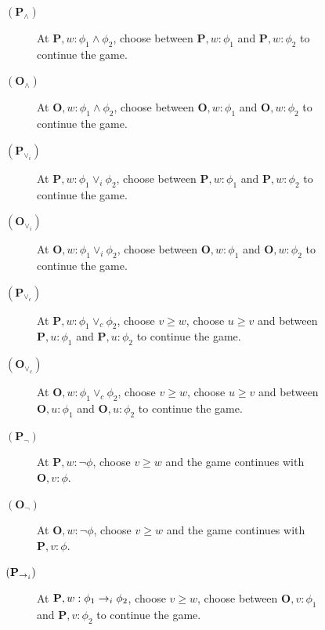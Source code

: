 \begin{figure}
\begin{minipage}[t]{\textwidth}
    \hrulefill
\begin{description}
\item[$(\mathbf{P}_\wedge)$] At $\mathbf{P}, w: \phi_1\wedge \phi_2$, \You
    choose between $\mathbf{P},w:\phi_1$ and 
    $\mathbf{P},w:\phi_2$ to continue the game. 
    
\item[$(\mathbf{O}_\wedge)$] At $\mathbf{O}, w:
    \phi_1\wedge \phi_2$, \Ic choose between $\mathbf{O}, w:\phi_1$
    and $\mathbf{O}, w:\phi_2$ to continue the game. 

\vspace{2mm}

\item[$(\mathbf{P}_{\vee_i})$] At $\mathbf{P}, w: \phi_1 \vee_i \phi_2$, \Ic choose between $\mathbf{P}, w:\phi_1$ and $\mathbf{P}, w:\phi_2$ to continue the game.

\item[$(\mathbf{O}_{\vee_i})$] At $\mathbf{O}, w: \phi_1 \vee_i \phi_2$, \You choose between $\mathbf{O}, w:\phi_1$ and $\mathbf{O}, w:\phi_2$ to continue the game.

\vspace{2mm}

\item[$(\mathbf{P}_{\vee_c})$] At $\mathbf{P}, w: \phi_1 \vee_c \phi_2$, \You choose $v \geq w$, \Ic choose $u \geq v$ and between $\mathbf{P}, u:\phi_1$ and $\mathbf{P}, u:\phi_2$ to continue the game.

\item[$(\mathbf{O}_{\vee_c})$] At $\mathbf{O}, w: \phi_1 \vee_c \phi_2$, \Ic choose $v \geq w$, \You choose $u \geq v$ and between $\mathbf{O}, u:\phi_1$ and $\mathbf{O}, u:\phi_2$ to continue the game.

\vspace{2mm}

\item[$(\mathbf{P}_\neg)$] At $\mathbf{P}, w: \neg \phi$, \You choose $v \geq w$ and the game continues with $\mathbf{O}, v: \phi$.

\item[$(\mathbf{O}_\neg)$] At $\mathbf{O}, w: \neg \phi$, \Ic choose $v \geq w$ and the game continues with $\mathbf{P}, v: \phi$.

\vspace{2mm}

\item[$(\mathbf{P}_{\rightarrow_i})$] At $\mathbf{P}, w: \phi_1 \rightarrow_i \phi_2$, \You choose $v \geq w$, \Ic choose between $\mathbf{O}, v:\phi_1$ and $\mathbf{P}, v:\phi_2$ to continue the game.


\end{description}
\end{minipage}
\end{figure}
